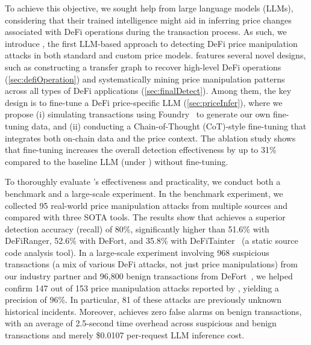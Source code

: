 To achieve this objective, we sought help from large language models (LLMs), considering that their trained intelligence might aid in inferring price changes associated with DeFi operations during the transaction process.
As such, we introduce \tool, the first LLM-based approach to detecting DeFi price manipulation attacks in both standard and custom price models.
\tool features several novel designs, such as constructing a transfer graph to recover high-level DeFi operations (\mysec\ref{sec:defiOperation}) and systematically mining price manipulation patterns across all types of DeFi applications (\mysec\ref{sec:finalDetect}).
Among them, the key design is to fine-tune a DeFi price-specific LLM (\mysec\ref{sec:priceInfer}), where we propose (i) simulating transactions using Foundry~\cite{Foundry} to generate our own fine-tuning data, and (ii) conducting a Chain-of-Thought (CoT)-style fine-tuning that integrates both on-chain data and the price context.
The ablation study shows that fine-tuning increases the overall detection effectiveness by up to 31\% compared to the baseline LLM (under \tool) without fine-tuning.

To thoroughly evaluate \tool's effectiveness and practicality, we conduct both a benchmark and a large-scale experiment.
In the benchmark experiment, we collected 95 real-world price manipulation attacks from multiple sources and compared \tool with three SOTA tools.
The results show that \tool achieves a superior detection accuracy (recall) of 80\%, significantly higher than 51.6\% with DeFiRanger, 52.6\% with DeFort, and 35.8\% with DeFiTainter~\cite{DeFiTainter23} (a static source code analysis tool).
In a large-scale experiment involving 968 suspicious transactions (a mix of various DeFi attacks, not just price manipulations) from our industry partner and 96,800 benign transactions from DeFort~\cite{DeFort24}, we helped confirm 147 out of 153 price manipulation attacks reported by \tool, yielding a precision of 96\%.
In particular, 81 of these attacks are previously unknown historical incidents.
Moreover, \name achieves zero false alarms on benign transactions, with an average of 2.5-second time overhead across suspicious and benign transactions and merely \$0.0107 per-request LLM inference cost.

